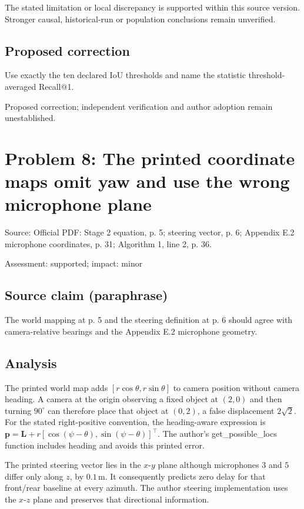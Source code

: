 \documentclass[11pt]{article}
\begin{document}
The stated limitation or local discrepancy is supported within this source version. Stronger causal, historical-run or population conclusions remain unverified.

\subsection*{Proposed correction}

Use exactly the ten declared IoU thresholds and name the statistic threshold-averaged Recall@1.

Proposed correction; independent verification and author adoption remain unestablished.

\section*{Problem 8: The printed coordinate maps omit yaw and use the wrong microphone plane}

Source: Official PDF: Stage 2 equation, p. 5; steering vector, p. 6; Appendix E.2 microphone coordinates, p. 31; Algorithm 1, line 2, p. 36.

Assessment: supported; impact: minor

\subsection*{Source claim (paraphrase)}

The world mapping at p. 5 and the steering definition at p. 6 should agree with camera-relative bearings and the Appendix E.2 microphone geometry.

\subsection*{Analysis}

The printed world map adds \([r\cos\theta,r\sin\theta]\) to camera position without camera heading. A camera at the origin observing a fixed object at \((2,0)\) and then turning \(90^\circ\) can therefore place that object at \((0,2)\), a false displacement \(2\sqrt2\). For the stated right-positive convention, the heading-aware expression is \(\mathbf p=\mathbf L+r[\cos(\psi-\theta),\sin(\psi-\theta)]^\top\). The author's get\_possible\_locs function includes heading and avoids this printed error.

The printed steering vector lies in the \(x\)-\(y\) plane although microphones \(3\) and \(5\) differ only along \(z\), by \(0.1\,\mathrm m\). It consequently predicts zero delay for that front/rear baseline at every azimuth. The author steering implementation uses the \(x\)-\(z\) plane and preserves that directional information.
\end{document}
